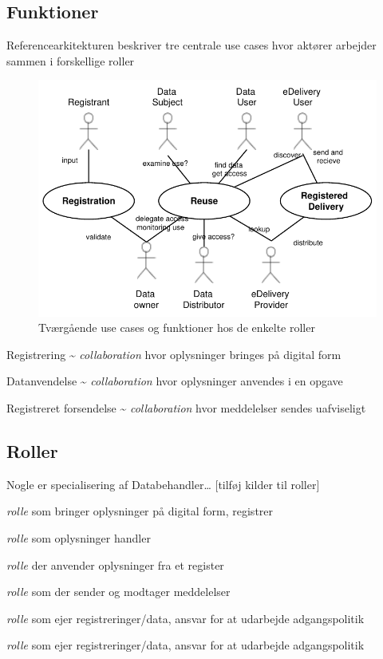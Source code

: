 \subsection{Funktioner}\label{funktioner}

Referencearkitekturen beskriver tre centrale use cases hvor aktører
arbejder sammen i forskellige roller

\begin{figure}
\centering
\includegraphics{usecases.pdf}
\caption{Tværgående use cases og funktioner hos de enkelte roller}
\end{figure}

Registrering \textasciitilde{} \emph{collaboration} hvor oplysninger
bringes på digital form

Datanvendelse \textasciitilde{} \emph{collaboration} hvor oplysninger
anvendes i en opgave

Registreret forsendelse \textasciitilde{} \emph{collaboration} hvor
meddelelser sendes uafviseligt

\subsection{Roller}\label{roller}

Nogle er specialisering af Databehandler\ldots{} {[}tilføj kilder til
roller{]}

\begin{description}
\tightlist
\item[Registrant]
\emph{rolle} som bringer oplysninger på digital form, registrer
\item[Datasubject]
\emph{rolle} som oplysninger handler
\item[Dataanvender]
\emph{rolle} der anvender oplysninger fra et register
\item[eDelivery kunde/forbruger?]
\emph{rolle} som der sender og modtager meddelelser
\item[Dataejer]
\emph{rolle} som ejer registreringer/data, ansvar for at udarbejde
adgangspolitik
\item[Datadistributør]
\emph{rolle} som ejer registreringer/data, ansvar for at udarbejde
adgangspolitik
\end{description}

